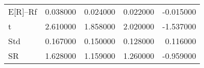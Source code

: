 \begin{tabular}{lrrrr}
\toprule
\midrule
E[R]--Rf & 0.038000 & 0.024000 & 0.022000 & -0.015000 \\
t & 2.610000 & 1.858000 & 2.020000 & -1.537000 \\
Std & 0.167000 & 0.150000 & 0.128000 & 0.116000 \\
SR & 1.628000 & 1.159000 & 1.260000 & -0.959000 \\
\bottomrule
\end{tabular}
